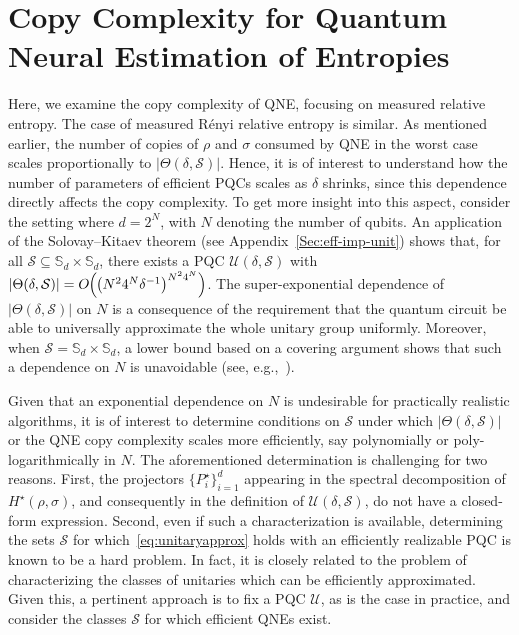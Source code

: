 \documentclass[a4paper,onecolumn,11pt,accepted=2026-05-12]{quantumarticle}
\newcommand{\cS}{\mathcal{S}}
\newcommand{\cU}{\mathcal{U}}
\begin{document}
\section{Copy Complexity for Quantum Neural Estimation of Entropies}
\label{Sec:copycomp}
Here, we examine the copy complexity of QNE, focusing on measured relative entropy. The case of measured R\'{e}nyi relative entropy is similar.  As mentioned earlier, the number of copies of $\rho$ and $\sigma$ consumed by QNE in the worst case  scales proportionally to $|\Theta(\delta,\cS)|$. Hence, it is of interest to understand how the number of parameters of efficient PQCs scales as $\delta$ shrinks, since this dependence directly affects the copy complexity. To get more insight into this aspect, consider the setting where   
 $d=2^N$, with $N$ denoting  the number of qubits. An application of the Solovay--Kitaev theorem (see  Appendix~\ref{Sec:eff-imp-unit}) 
shows that, for all $\cS \subseteq \mathbb{S}_d \times \mathbb{S}_d$,  there exists a PQC $\cU(\delta,\cS)$ with $|\Theta(\delta,\cS)| = O\mspace{-1 mu}\Big(\mspace{-1 mu}\big(N^2 4^N \delta^{-1}\big)^{N^24^N}\Big)$. The super-exponential dependence of $|\Theta(\delta,\cS)|$ on $N$ is a consequence of the requirement that the quantum circuit be able to universally approximate  the whole unitary group uniformly. Moreover, when $\cS=\mathbb{S}_d \times \mathbb{S}_d$, a  lower bound based on a covering argument shows that such a dependence on $N$ is unavoidable (see, e.g.,~\cite[Section~4.5.4]{Nielsen_Chuang_2010}). 

 
Given that an exponential dependence on $N$ is undesirable for practically realistic algorithms, it is of interest to determine conditions on $\cS$ under which $|\Theta(\delta,\cS)|$ or the QNE copy complexity scales more efficiently, say polynomially or poly-logarithmically in $N$. The aforementioned determination is challenging for two reasons. First, the projectors  $\{P_i^{\star}\}_{i=1}^d$ appearing in the spectral decomposition of $H^{\star}(\rho,\sigma)$, and consequently in the definition of $\cU(\delta,\cS)$, do not have a closed-form expression. 
Second, even if such a characterization is available, determining the sets $\cS$ for which~\eqref{eq:unitaryapprox} holds with an efficiently realizable PQC is known to be a hard problem. In fact, it is closely related to the problem of characterizing the classes of unitaries which can be efficiently approximated. Given this, a pertinent approach is to fix a PQC $\cU$, as is the case in practice, and consider the classes $\cS$ for which efficient QNEs exist. 
\end{document}
